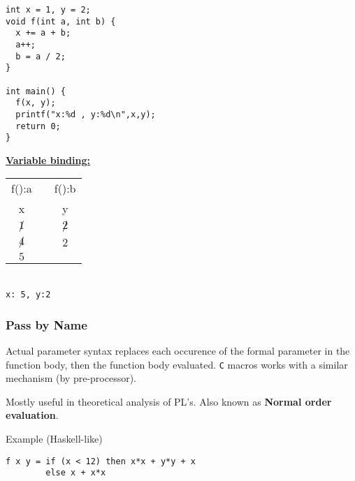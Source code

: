 \begin{minipage}{.4\linewidth}

\begin{listing}[H]
\begin{verbatim}
int x = 1, y = 2;
void f(int a, int b) {
  x += a + b;
  a++;
  b = a / 2;
}

int main() {
  f(x, y);
  printf("x:%d , y:%d\n",x,y);
  return 0;
}
\end{verbatim}
\caption{}
\label{code:code7}
\end{listing}

\end{minipage}%
\begin{minipage}{.1\linewidth}
  \vspace*{\fill}
  \hspace*{\fill}
\end{minipage}%
\begin{minipage}{.4\linewidth}
  \underline{\textbf{Variable binding:}}\\
  \begin{tabular}{cp{.5em}c}
    f():a & & f():b \\
    x & & y \\ \cline{1-1} \cline{3-3}
    $\not 1$ 		& &  	$\not 2$	\\
    $\not 4$ 		& &  	$2$	\\
    $5$ 			& &  		\\
  \end{tabular}\\
  \texttt{x: 5, y:2}
\end{minipage}

\subsubsection{Pass by Name}

Actual parameter syntax replaces each occurence of the formal parameter in the function body, then the function body evaluated. \texttt{C} macros works with a similar mechanism (by pre-processor).

\noindent Mostly useful in theoretical analysis of PL's. Also known as \textbf{Normal order evaluation}.

Example (Haskell-like)
\begin{listing}[ht]

\begin{verbatim}
f x y = if (x < 12) then x*x + y*y + x 
        else x + x*x
\end{verbatim}

\caption{}
\label{code:code8}
\end{listing}

